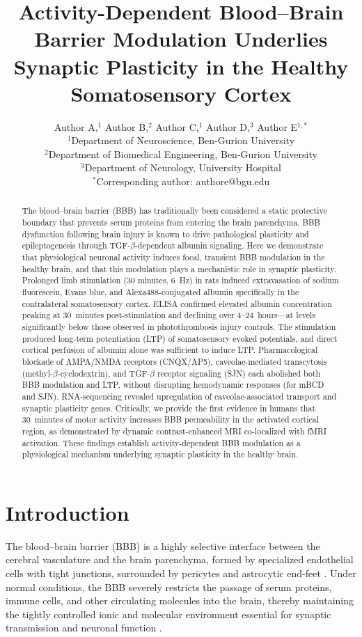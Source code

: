 \documentclass[11pt]{article}
\title{Activity-Dependent Blood--Brain Barrier Modulation Underlies Synaptic Plasticity in the Healthy Somatosensory Cortex}
\author{Author A,$^{1}$ Author B,$^{2}$ Author C,$^{1}$ Author D,$^{3}$ Author E$^{1,*}$\\
\small $^{1}$Department of Neuroscience, Ben-Gurion University\\
\small $^{2}$Department of Biomedical Engineering, Ben-Gurion University\\
\small $^{3}$Department of Neurology, University Hospital\\
\small $^{*}$Corresponding author: authore@bgu.edu}
\date{}
\begin{document}
\maketitle

\begin{abstract}
The blood--brain barrier (BBB) has traditionally been considered a static protective boundary that prevents serum proteins from entering the brain parenchyma. BBB dysfunction following brain injury is known to drive pathological plasticity and epileptogenesis through TGF-$\beta$-dependent albumin signaling. Here we demonstrate that physiological neuronal activity induces focal, transient BBB modulation in the healthy brain, and that this modulation plays a mechanistic role in synaptic plasticity. Prolonged limb stimulation (30 minutes, 6~Hz) in rats induced extravasation of sodium fluorescein, Evans blue, and Alexa488-conjugated albumin specifically in the contralateral somatosensory cortex. ELISA confirmed elevated albumin concentration peaking at 30~minutes post-stimulation and declining over 4--24~hours---at levels significantly below those observed in photothrombosis injury controls. The stimulation produced long-term potentiation (LTP) of somatosensory evoked potentials, and direct cortical perfusion of albumin alone was sufficient to induce LTP. Pharmacological blockade of AMPA/NMDA receptors (CNQX/AP5), caveolae-mediated transcytosis (methyl-$\beta$-cyclodextrin), and TGF-$\beta$ receptor signaling (SJN) each abolished both BBB modulation and LTP, without disrupting hemodynamic responses (for mBCD and SJN). RNA-sequencing revealed upregulation of caveolae-associated transport and synaptic plasticity genes. Critically, we provide the first evidence in humans that 30~minutes of motor activity increases BBB permeability in the activated cortical region, as demonstrated by dynamic contrast-enhanced MRI co-localized with fMRI activation. These findings establish activity-dependent BBB modulation as a physiological mechanism underlying synaptic plasticity in the healthy brain.
\end{abstract}

\section{Introduction}

The blood--brain barrier (BBB) is a highly selective interface between the cerebral vasculature and the brain parenchyma, formed by specialized endothelial cells with tight junctions, surrounded by pericytes and astrocytic end-feet \citep{abbott2010structure, zlokovic2008blood}. Under normal conditions, the BBB severely restricts the passage of serum proteins, immune cells, and other circulating molecules into the brain, thereby maintaining the tightly controlled ionic and molecular environment essential for synaptic transmission and neuronal function \citep{pardridge2005molecular}.
\end{document}
